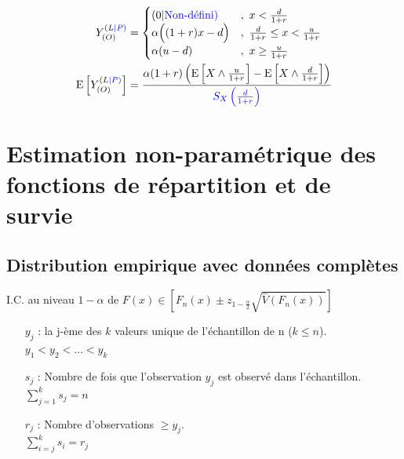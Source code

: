 \documentclass[10pt, french]{article}
\begin{document}
\begin{multicols*}{3}
\begin{align*}
Y^{(L\textcolor{blue}{|P)}}_{(O)} &= 
\begin{cases}
(0 {\color{blue}{| \text{Non-défini})}}		& ,\ x  < \frac{d}{1+r} \\
\alpha \Big( (1+r) x - d \Big)	& ,\ \frac{d}{1+r} \leq x < \frac{u}{1+r} \\
\alpha (u-d)		& ,\ x \geq \frac{u}{1+r} 
\\
\end{cases}
\\
\mathrm{E} \left[ Y^{(L\textcolor{blue}{|P)}}_{(O)} \right] &= \frac{\alpha (1+r) \left( \mathrm{E} \left[ X \wedge \frac{u}{1+r} \right] - \mathrm{E} \left[ X \wedge \frac{d}{1+r} \right]   \right)}{{\color{blue}{S_X \left( \frac{d}{1+r} \right)}}} 
\end{align*}

\setcounter{section}{13}
\section{Estimation non-paramétrique des fonctions de répartition et de survie}

\subsection*{Distribution empirique avec données complètes}

I.C. au niveau $1 - \alpha$ de $F(x) \in \left[F_n(x) \pm z_{1 - \frac{\alpha}{2}} \sqrt{\widehat{V}(F_n(x))} \right]$
\begin{enumerate}
	\item[$y_j$ : ] la j-ème des $k$ valeurs unique de l'échantillon de n ($k \le n$).\\
	$y_1 < y_2 < \dots < y_k$
	\item[$s_j$ : ] Nombre de fois que l'observation $y_j$ est observé dans l'échantillon.\\
	$\sum_{j = 1}^{k}s_j = n$
	\item[$r_j$ : ] Nombre d'observations $\ge y_j$. \\
	$\sum_{i = j}^{k}s_i = r_j$
\end{enumerate}


\end{multicols*}
\end{document}
